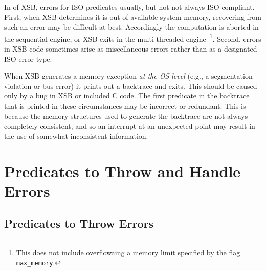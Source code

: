 In \version{} of XSB, errors for ISO predicates usually, but not not
always ISO-compliant.  First, when XSB determines it is out of
available system memory, recovering from such an error may be
difficult at best.  Accordingly the computation is aborted in the
sequential engine, or XSB exits in the multi-threaded
engine~\footnote{This does not include overflowaing a memory limit
  specified by the flag {\tt max\_memory}.}.  Second, errors in XSB
code sometimes arise as miscellaneous errors rather than as a
designated ISO-error type.

When XSB generates a memory exception {\em at the OS level} (e.g., a
segmentation violation or bus error) it prints out a backtrace and
exits.  This should be caused only by a bug in XSB or included C code.
The first predicate in the backtrace that is printed in these
circumstances may be incorrect or redundant.  This is because the
memory structures used to generate the backtrace are not always
completely consistent, and so an interrupt at an unexpected point may
result in the use of somewhat inconsistent information.

\section{Predicates to Throw and Handle Errors}
\label{sec:errorpredicates}

\subsection{Predicates to Throw Errors}

